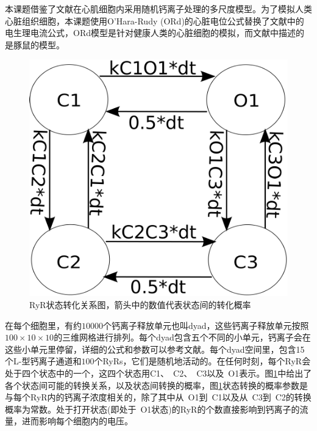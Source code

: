  本课题借鉴了文献在心肌细胞内采用随机钙离子处理的多尺度模型。为了模拟人类心脏组织细胞，本课题使用O'Hara-Rudy (ORd)的心脏电位公式替换了文献中的电生理电流公式，ORd模型是针对健康人类的心脏细胞的模拟，而文献中描述的是豚鼠的模型。
 \begin{figure}[ht]
\center
\includegraphics[scale=0.6]{figs/state.pdf}
\caption{RyR状态转化关系图，箭头中的数值代表状态间的转化概率}
\label{ryrstates}
\end{figure}
在每个细胞里，有约$10000$个钙离子释放单元也叫dyad，这些钙离子释放单元按照$100\times 10\times 10$的三维网格进行排列。每个dyad包含五个不同的小单元，钙离子会在这些小单元里停留，详细的公式和参数可以参考文献。每个dyad空间里，包含15个L-型钙离子通道和$100$个RyRs，它们是随机地活动的。在任何时刻，每个RyR会处于四个状态中的一个，这四个状态用C1、~C2、~C3以及~O1表示。图\ref{ryrstates}中给出了各个状态间可能的转换关系，以及状态间转换的概率，图\ref{ryrstates}状态转换的概率参数是与每个RyR内的钙离子浓度相关的，除了其中从~O1到~C1以及从~C3到~C2的转换概率为常数。处于打开状态(即处于~O1状态)的RyR的个数直接影响到钙离子的流量，进而影响每个细胞内的电压。

